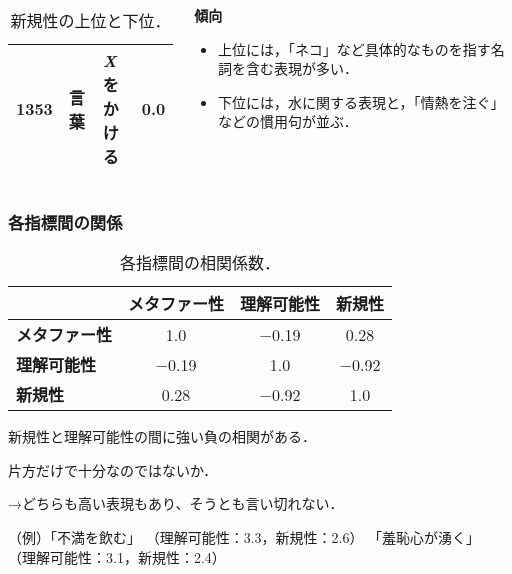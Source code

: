 \documentclass[12pt,usepdftitle=false]{beamer}
\newcommand\header[1]{\multicolumn{1}{c}{\textbf{#1}}}
\begin{document}
\begin{frame}
\begin{columns}
\begin{column}{0.6\textwidth}
\begin{table}[t]
\begin{tabular}{rllc}
                    1353          & 言葉          & \emph{X}をかける     & 0.0           \\
                    \bottomrule%
                \end{tabular}
                \caption{新規性の上位と下位．}\label{tab:novrank}
            \end{table}
        \end{column}
        \begin{column}{0.4\textwidth}
            \textbf{傾向}
            \begin{itemize}
                \item 上位には，「ネコ」など具体的なものを指す名詞を含む表現が多い．
                \item 下位には，水に関する表現と，「情熱を注ぐ」などの慣用句が並ぶ．
            \end{itemize}

        \end{column}
    \end{columns}
\end{frame}

\begin{frame}
    \frametitle{各指標間の関係}
    \begin{table}[t]
        \centering\footnotesize
        \begin{tabular}{lccc}
            \toprule
                         & \header{メタファー性}
                         & \header{理解可能性}
                         & \header{新規性} \\
            \midrule
            \textbf{メタファー性} & 1.0   & −0.19 & 0.28  \\
            \textbf{理解可能性}   & −0.19 & 1.0   & −0.92 \\
            \textbf{新規性}       & 0.28  & −0.92 & 1.0  \\
            \bottomrule
        \end{tabular}
        \caption{各指標間の相関係数．}\label{corr}
    \end{table}
    新規性と理解可能性の間に強い負の相関がある．

    \bigskip

    片方だけで十分なのではないか．

    →どちらも高い表現もあり、そうとも言い切れない．

    （例）「不満を飲む」 （理解可能性：3.3，新規性：2.6）\newline
    \phantom{（例）}「羞恥心が湧く」 （理解可能性：3.1，新規性：2.4）
\end{frame}
\end{document}

